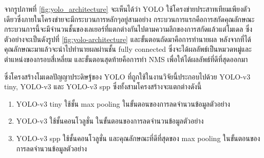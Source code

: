 จากรูปภาพที่ \ref{fig:yolo_architecture} จะเห็นได้ว่า YOLO ใช้โครงข่ายประสาทเทียมเพียงตัวเดียวซึ่งภายในโครงข่ายจะมีกระบวนการหลักๆอยู่สามอย่าง 
กระบวนการแรกคือการสกัดคุณลักษณะ กระบวนการนี้จะมีจำนวนชั้นของเลเยอร์ที่แตกต่างกันไปตามความลึกของการสกัดแล้วแต่โมเดล ซึ่งตัวอย่างจะเป็นดังรูปที่ \ref{fig:yolo-architecture} 
และขั้นตอนถัดมาคือการทำนายผล หลังจากที่ได้คุณลักษณะมาแล้วจะนำไปทำนายผลผ่านชั้น fully connected ซึ่งจะได้ผลลัพธ์เป็นหมวดหมู่และตำแหน่งของกรอบสี่เหลี่ยม 
และขั้นตอนสุดท้ายคือการทำ NMS เพื่อให้ได้ผลลัพธ์ที่ดีที่สุดออกมา
\clearpage
\par ซึ่งโครงสร้างโมเดลปัญญาประดิษฐ์ของ YOLO ที่ถูกใช้ในงานวิจัยนี้ประกอบไปด้วย YOLO-v3 tiny, YOLO-v3 และ YOLO-v3 spp ซึ่งทั้งสามโครงสร้างจะแตกต่างดังนี้
\begin{enumerate}
	\setlength\itemsep{-0.25em}
	\item YOLO-v3 tiny ใช้ชั้น max pooling ในขั้นตอนของการลดจำนวนข้อมูลตัวอย่าง
	\item YOLO-v3 ใช้ชั้นคอนโวลูชั่น ในขั้นตอนของการลดจำนวนข้อมูลตัวอย่าง
	\item YOLO-v3 spp ใช้ชั้นคอนโวลูชั่น และคุณลักษณะที่ดีที่สุดของ max pooling ในขั้นตอนของการลดจำนวนข้อมูลตัวอย่าง
\end{enumerate}

